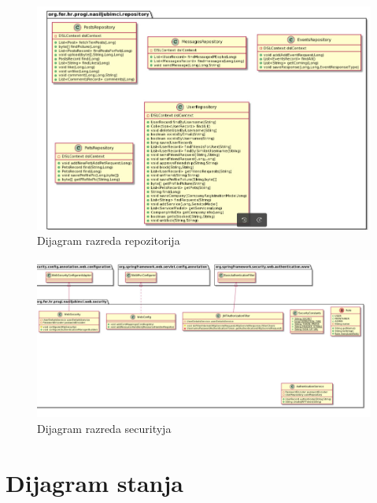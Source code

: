 			\begin{figure}[H]
				\includegraphics[scale=0.4]{slike/repository.jpeg} %
				\centering
				\caption{Dijagram razreda repozitorija}
			\end{figure}
		
			\begin{figure}[H]
				\includegraphics[scale=0.3]{slike/security.jpeg} %
				\centering
				\caption{Dijagram razreda securityja}
			\end{figure}
			
			
			\eject
		
		\section{Dijagram stanja}
			
